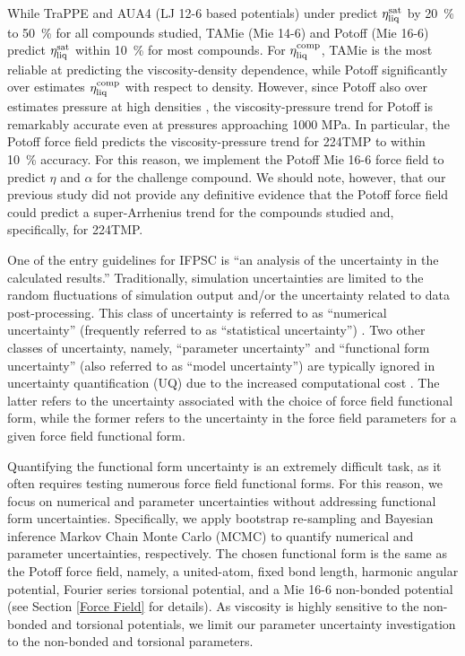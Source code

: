 \documentclass[preprint,review,12pt]{elsarticle}
\begin{document}
	While TraPPE and AUA4 (LJ 12-6 based potentials) under predict $\eta_{\rm liq}^{\rm sat}$ by 20~\% to 50~\% for all compounds studied, TAMie (Mie 14-6) and Potoff (Mie 16-6) predict $\eta_{\rm liq}^{\rm sat}$ within 10~\% for most compounds. For $\eta_{\rm liq}^{\rm comp}$, TAMie is the most reliable at predicting the viscosity-density dependence, while Potoff significantly over estimates $\eta_{\rm liq}^{\rm comp}$ with respect to density. However, since Potoff also over estimates pressure at high densities \cite{Postdoc_2}, the viscosity-pressure trend for Potoff is remarkably accurate even at pressures approaching 1000 MPa. In particular, the Potoff force field predicts the viscosity-pressure trend for 224TMP to within 10~\% accuracy. For this reason, we implement the Potoff Mie 16-6 force field to predict $\eta$ and $\alpha$ for the challenge compound. We should note, however, that our previous study did not provide any definitive evidence that the Potoff force field could predict a super-Arrhenius trend for the compounds studied and, specifically, for 224TMP.
	 
	One of the entry guidelines for IFPSC is ``an analysis of the uncertainty in the calculated results.'' Traditionally, simulation uncertainties are limited to the random fluctuations of simulation output and/or the uncertainty related to data post-processing. This class of uncertainty is referred to as ``numerical uncertainty'' (frequently referred to as ``statistical uncertainty'') \cite{Bay_Deriv,Bay_MD,Bay_UQ,Mess4}. Two other classes of uncertainty, namely, ``parameter uncertainty'' and ``functional form uncertainty'' (also referred to as ``model uncertainty'') are typically ignored in uncertainty quantification (UQ) due to the increased computational cost \cite{Bay_Deriv,Bay_MD,Bay_UQ,Mess4}. The latter refers to the uncertainty associated with the choice of force field functional form, while the former refers to the uncertainty in the force field parameters for a given force field functional form.
	
	
	Quantifying the functional form uncertainty is an extremely difficult task, as it often requires testing numerous force field functional forms. For this reason, we focus on numerical and parameter uncertainties without addressing functional form uncertainties. Specifically, we apply bootstrap re-sampling \cite{Efron1979} and Bayesian inference Markov Chain Monte Carlo (MCMC) \cite{Bay_Deriv,Postdoc_2} to quantify numerical and parameter uncertainties, respectively. The chosen functional form is the same as the Potoff force field, namely, a united-atom, fixed bond length, harmonic angular potential, Fourier series torsional potential, and a Mie 16-6 non-bonded potential (see Section \ref{Force Field} for details). As viscosity is highly sensitive to the non-bonded \cite{Gordon2006,Postdoc_3} and torsional \cite{Nieto2006,Braga2012} potentials, we limit our parameter uncertainty investigation to the non-bonded and torsional parameters. 
	
\end{document}
